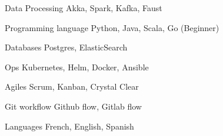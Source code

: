 

\begin{cvskills}

  \cvskill
    {Data Processing} %
    {Akka, Spark, Kafka, Faust} %

  \cvskill
    {Programming language} %
    {Python, Java, Scala, Go (Beginner)} %

  \cvskill
    {Databases} %
    {Postgres, ElasticSearch} %

  \cvskill
    {Ops} %
    {Kubernetes, Helm, Docker, Ansible} %

  \cvskill
    {Agiles} %
    {Scrum, Kanban, Crystal Clear} %

  \cvskill
    {Git workflow} %
    {Github flow, Gitlab flow} %

  \cvskill
    {Languages} %
    {French, English, Spanish} %

\end{cvskills}
